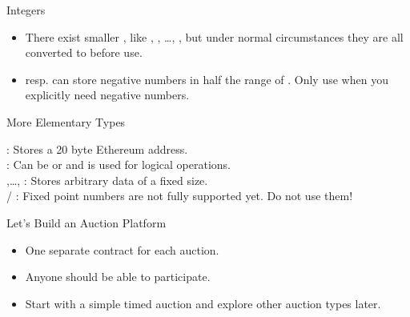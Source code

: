 \documentclass[handout]{beamer}
\begin{document}
\begin{frame}{Integers}

\begin{itemize}
 \item<1->{There exist smaller , like , , \dots , , but under normal circumstances they are all converted to before use.}
 
\item<2->{resp. can store negative numbers in half the range of . Only use when you explicitly need negative numbers. }
\end{itemize}

\end{frame}

\begin{frame}{More Elementary Types}

: Stores a 20 byte Ethereum address. \\
 	\vspace{0.5em}  
: Can be or and is used for logical operations. \\
	\vspace{0.5em}
,\dots, : Stores arbitrary data of a fixed size.\\
	\vspace{0.5em}
 / : Fixed point numbers are not fully supported yet. Do not use them!	\\
	\vspace{1em}
	
\end{frame}

\begin{frame}{Let's Build an Auction Platform}

	\begin{itemize}
		\item<1->{One separate contract for each auction.}
		\item<1->{Anyone should be able to participate.}
		\item<1->{Start with a simple timed auction and explore other auction types later.}
	\end{itemize}
	
	
\end{frame}
\end{document}
